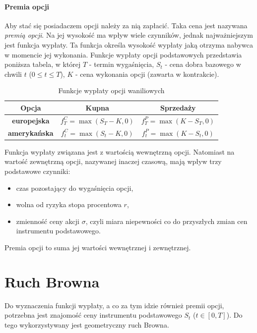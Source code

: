 \documentclass[]{pwr_wmat_praca_dyplomowa}
\theoremstyle{plain}
\numberwithin{theorem}{chapter}
\theoremstyle{definition}
\numberwithin{theorem}{chapter}
\begin{document}
\paragraph{Premia opcji} Aby stać się posiadaczem opcji należy za nią zapłacić. Taka cena jest nazywana \textit{premią opcji}. Na jej wysokość ma wpływ wiele czynników, jednak najważniejszym jest funkcja wypłaty. Ta funkcja określa wysokość wypłaty jaką otrzyma nabywca w momencie jej wykonania. Funkcje wypłaty opcji podstawowych przedstawia poniższa tabela, w której $T$ - termin wygaśnięcia, $S_t$ - cena dobra bazowego w chwili $t$ ($0 \leq t \leq T$), $K$ - cena wykonania opcji (zawarta w kontrakcie).

\begin{table}[ht]
\caption{Funkcje wypłaty opcji waniliowych}
\centering
\begin{tabular}{|c|c|c|}
\hline                       
\textbf{Opcja} & \textbf{Kupna} & \textbf{Sprzedaży}\\
\hline 
\textbf{europejska} & $f_T^C = \max(S_T-K,0)$ & $f_T^P = \max(K-S_T,0)$  \\[1ex]
\textbf{amerykańska} & $f_t^C = \max(S_t-K,0)$ & $f_t^P = \max(K-S_t,0)$  \\[1ex]  
\hline 
\end{tabular}
\label{tab:wyplata} 
\end{table}
\noindent Funkcja wypłaty związana jest z wartością wewnętrzną opcji. Natomiast na wartość zewnętrzną opcji, nazywanej inaczej czasową, mają wpływ trzy podstawowe czynniki:
\begin{itemize}
\item czas pozostający do wygaśnięcia opcji,
\item wolna od ryzyka stopa procentowa $r$,
\item zmienność ceny akcji $\sigma$, czyli miara niepewności co do przyszłych zmian cen instrumentu podstawowego.
\end{itemize}
Premia opcji to suma jej wartości wewnętrznej i zewnętrznej.

\section{Ruch Browna}

Do wyznaczenia funkcji wypłaty, a co za tym idzie również premii opcji, potrzebna jest znajomość ceny instrumentu podstawowego $S_t$ ($t \in [0,T]$). Do tego wykorzystywany jest geometryczny ruch Browna.
\end{document}

